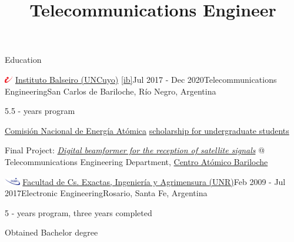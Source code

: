 \documentclass{resume} %
\title{Telecommunications Engineer}
\begin{document}

\begin{rSection}{Education}

    \begin{rSubsection}{\includegraphics[height=0.3cm]{images/ib-logo.png} \href{https://www.ib.edu.ar/}{Instituto Balseiro (UNCuyo)} \ref{ib}}{Jul 2017 - Dec 2020}{Telecommunications Engineering}{San Carlos de Bariloche, Río Negro, Argentina}
        \item 5.5 - years program
        \item \href{https://www.argentina.gob.ar/cnea}{Comisión Nacional de Energía Atómica} \href{https://www.ib.edu.ar/ingreso-a-carreras/becas.html}{scholarship for undergraduate students}
        \item Final Project: \href{https://github.com/grigosback/digital-beamforming}{\textit{Digital beamformer for the reception of satellite signals}} @ Telecommunications Engineering Department, \href{https://www.argentina.gob.ar/cnea/centros-atomicos/cab}{Centro Atómico Bariloche}
    \end{rSubsection}

    \begin{rSubsection}{\includegraphics[height=0.3cm]{images/fceia.png} \href{https://web.fceia.unr.edu.ar/}{Facultad de Cs. Exactas, Ingeniería y Agrimensura (UNR)}}{Feb 2009 - Jul 2017}{Electronic Engineering}{Rosario, Santa Fe, Argentina}
        \item 5 - years program, three years completed
        \item Obtained Bachelor degree
    \end{rSubsection}
\end{rSection}

\end{document}
